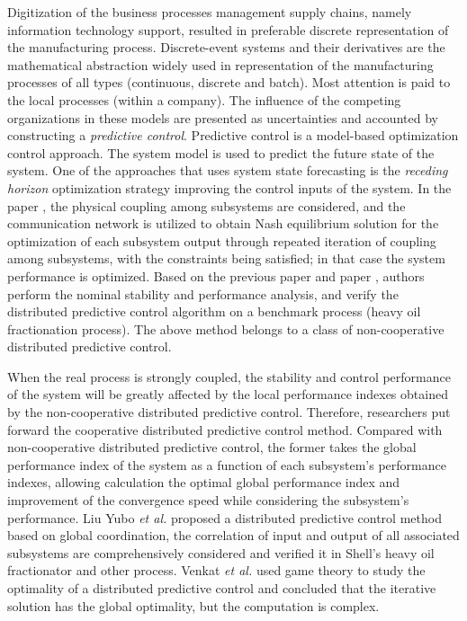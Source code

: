 \documentclass[conference]{IEEEtran}
\begin{document}
Digitization of the business processes management supply chains, namely information technology support, resulted in preferable discrete representation of the manufacturing process. Discrete-event systems and their derivatives are the mathematical abstraction widely used in representation of the manufacturing processes of all types (continuous, discrete and batch). Most attention is paid to the local processes (within a company). The influence of the competing organizations in these models are presented as uncertainties and accounted by constructing a \emph{predictive control}.  Predictive control is a model-based optimization control approach. The system model is used to predict the future state of the system. One of the approaches that uses system state forecasting is the \emph{receding horizon} optimization strategy improving the control inputs of the system. In the paper \cite{dux}, the physical coupling among subsystems are considered, and the communication network is utilized to obtain Nash equilibrium solution for the optimization of each subsystem output through repeated iteration of coupling among subsystems, with the constraints being satisfied; in that case the system performance is optimized. Based on the previous paper \cite{dux} and paper \cite{lis}, authors perform the nominal stability and performance analysis, and verify the distributed predictive control algorithm on a benchmark process (heavy oil fractionation process). The above method belongs to a class of non-cooperative distributed predictive control.

When the real process is strongly coupled, the stability and control performance of the system will be greatly affected by the local performance indexes obtained by the non-cooperative distributed predictive control. Therefore, researchers put forward the cooperative distributed predictive control method. Compared with non-cooperative distributed predictive control, the former takes the global performance index of the system as a function of each subsystem's performance indexes, allowing calculation the optimal global performance index and improvement of the convergence speed while considering the subsystem's performance. Liu Yubo \emph{et al.} \cite{liuy} proposed a distributed predictive control method based on global coordination, the correlation of input and output of all associated subsystems are comprehensively considered and verified it in Shell's heavy oil fractionator and other process. Venkat \emph{et al.} \cite{venkat} used game theory to study the optimality of a distributed predictive control and concluded that the iterative solution has the global optimality, but the computation is complex.
\end{document}
